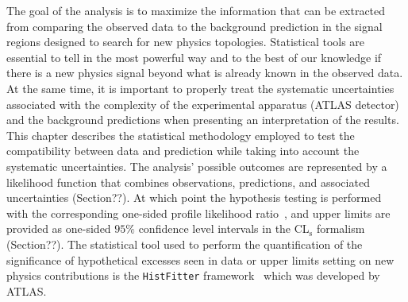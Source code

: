 The goal of the analysis is to maximize the information that can be 
extracted from comparing the observed data to the background 
prediction in the signal regions designed to search for new physics 
topologies. Statistical tools are essential to tell in the most 
powerful way and to the best of our knowledge if there is a new physics 
signal beyond what is already known in the observed data. 
At the same time, it is important to properly treat the systematic 
uncertainties associated with the complexity of the experimental 
apparatus (ATLAS detector) and the background predictions when 
presenting an interpretation of the results. 
This chapter describes the statistical methodology employed to 
test the compatibility between data and prediction while taking into 
account the systematic uncertainties. 
The analysis' possible outcomes are represented by a likelihood function 
that combines observations, predictions, and associated uncertainties 
(Section??). At which point the 
hypothesis testing is performed with the corresponding one-sided profile 
likelihood ratio~\cite{Cowan:2010js}, 
and upper limits are provided as one-sided $95\%$ confidence level intervals in the CL$_\text{s}$ formalism~\cite{Read:2002} (Section??). 
The statistical tool used to perform the quantification of the significance 
of hypothetical excesses seen in data
or upper limits setting on new physics contributions is the \texttt{HistFitter} 
framework~\cite{Baak:2014wma} which was developed by ATLAS.



